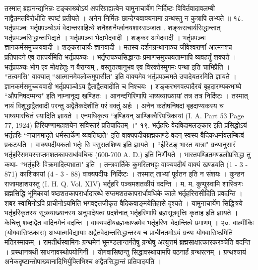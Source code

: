 तस्मात् ब्रह्यनन्द्यभिन्नः टङ्काख्योऽयं अपरिग्राह्यत्वेन यामुनाचार्येण निर्दिष्टः विविर्तवादावलम्बी नाद्वैतमतविरोधीति स्पष्टं प्रतीयते । अनेन निर्मितः छान्देग्यवाक्यनामा ग्रन्थस्तु न कुत्रापि लभ्यते ॥
१८. भर्तृप्रपञ्चः
भर्तृप्रपञ्चोऽयं वेदान्तसाहित्ये शनैश्शनैर्म्लानयशास्सञ्जातः . शङ्कराचार्यसिद्धान्तात् भर्तृप्रपञ्चसिद्धान्तःभिद्यते । भर्तृप्रपञ्चः भेदाभेदवादी । शङ्कर अभेदवादी । भर्तृप्रपञ्चः ज्ञानकर्मसमुच्चयवादी । शङ्कराचार्यः ज्ञानवादी । मतस्य दर्शनग्रन्थानाञ्च जीवेश्वराणांं आत्मनश्च प्रतिपादने एव तात्पर्यमिति भर्तृप्रपञ्चः । भर्तृप्तपञ्चसिद्धान्तः प्रमाणसमुच्चयताम्नापि व्यवहर्तुं शक्यते । भर्तृप्रपञ्चः भोग एव मोक्षहेतुः न वैराग्यम् , वस्तुतत्वानुभव एव विरक्तेस्मुगमः पन्था इति चाभिप्रैति । ``तत्वमसि" वाक्यात् ``आत्मानमेवलोकमुपासीत" इति वाक्यमेव भर्तृप्रपञ्चमते उपादेयतरमिति ज्ञायते ।
ज्ञानकर्मसमुच्चयवादी भर्तृप्रपञ्चोऽय द्वैताद्वैतवादीति च निश्चयः । शङ्करभगवत्पादैरयं बृहदारण्यकभाष्ये ``औपनिषदम्मन्य" इति नाम्नानूद्य खण्डितः । आनन्दगिरिणापि भाष्यव्याख्यायां तत्र तत्र निर्दिष्टः । तस्मात् नायं विशुद्धाद्वैतवादी परन्तु अद्वैतैकदेशीति परं वक्तुं अर्हः । अनेन कठोषनिषदां बृहदाण्यकस्य च भाष्यमारचितं स्यादिति ज्ञायते ।
एनमधिकृत्य ``इण्डियन् आण्डिक्वैरिपत्रिकायां (I. A. Part 53 Page 77, 1924) हिरियण्णामहाशयेन सविस्तरं प्रतिपादितम् ।"
१९. भर्तृहरिः
वेदविदामलङ्कार इति प्रसिद्धोऽयं भर्तृहरिः ``नचागमादृते धर्मस्तर्केण व्यवतिष्ठते" इति वाक्यपदीयब्रह्मकाण्डे वदन् स्वस्य वैदिकधर्मावलम्बित्वं प्रकटयति । वाक्यपदीयकर्ता भर्तृः रिः वसुरातशिष्य इति ज्ञायते । ``ईस्टिङ् भारत यात्रा" ग्रन्थानुसारं भर्तृहरिसमयस्सप्तमशतकापरार्धावधिक (600-700 A. D.) इति निर्णीयते । भारतपण्डितमण्डलीप्रसिद्धा तु कथा- ``भर्तृहरिः विक्रमादित्यभ्राता" इति । तन्त्रवार्तिके कुमरिलभट्टः वाक्यपदीयं वाक्यं खण्डयति (1 - 3 - 871) काशिकायां (4 - 3 - 88) वाक्यपदीयः निर्दिष्टः । तस्मात् ताभ्यां पूर्वतन इति न संशयः । कुन्हन राजामहाशयस्तु (I. H. Q. Vol. XIV) भर्तृहरि पञ्चमशतकीयं वदन्ति । म. म. कुप्पुस्वामि शास्त्रिणः ब्रह्मसिद्धि भूमिकायां षष्ठशतकापरार्धादारब्धे सप्तमशतकापरार्धावधिके काले भर्तृहरिरासीदिति प्रवदन्ति । शबर स्वामिनोऽपि प्राचीनोऽयमिति भगवद्दत्तजीकृत वैदिकवाङ्मयेतिहासे दृश्यते ।
यामुनाचार्येण सिद्धित्रये भर्तृहरिकृतस्य सूत्रव्याख्यानस्य अनुपादेयत्व प्रदर्शनात् भर्तृहरिणापि ब्रह्मसूत्रवृत्तिः कृताह इति ज्ञायते । केचित्तु शब्दाद्वैत वादिनमेनं वदन्ति । वाक्यपदीयब्रह्मकाण्डमेव भर्तृहरिणः वेदान्तित्वे प्रमाणम् ।
२०. वाल्मीकिः (योगवासिष्ठकारः)
अध्यात्मविद्यायाः अद्वैतवेदान्तसिद्धान्तस्य च प्राचीनतमोऽयं ग्रन्थः योगवासिष्ठमिति मतिरस्माकम् । रामतीर्थस्वामिनः ग्रन्थमेनं भूमण्डलान्तर्गतेषु ग्रन्थेषु अत्युत्तमं ब्रह्मसाक्षात्कारकरञ्चेति वदन्ति । प्रस्थानत्रथी साधनावस्थोपयोगिनी । योगवासिष्ठन्तु सिद्धावस्थायामपि पठनार्हं ग्रन्थरत्नम् । ग्रन्थश्चायं अनेकदृष्टान्तोपाख्यानादिभिर्युक्तिभिश्च अद्वैतसिद्धान्तं प्रतिपादयति ।
